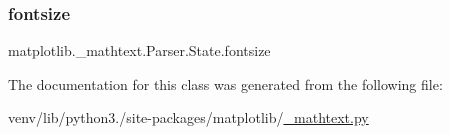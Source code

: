 \mbox{\label{classmatplotlib_1_1__mathtext_1_1Parser_1_1State_af1bf502ad777150a07b257aeb562ca57}} 
\subsubsection{\texorpdfstring{fontsize}{fontsize}}
{\footnotesize\ttfamily matplotlib.\+\_\+mathtext.\+Parser.\+State.\+fontsize}



The documentation for this class was generated from the following file\+:\begin{DoxyCompactItemize}
\item 
venv/lib/python3./site-\/packages/matplotlib/\hyperlink{__mathtext_8py}{\+\_\+mathtext.\+py}\end{DoxyCompactItemize}
